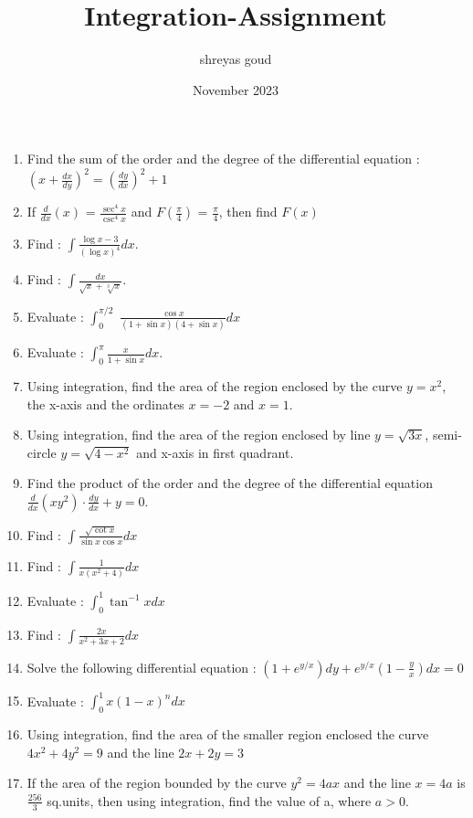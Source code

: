 \documentclass[12pt,-letter paper]{article}
\title{Integration-Assignment}
\author{shreyas goud }
\date{November 2023}
\providecommand{\brak}[1]{\ensuremath{\left(#1\right)}}
\begin{document}
\maketitle
  \begin{enumerate}
      \item Find the sum of the order and the degree of the differential equation :
      $\brak{x+\frac{dx}{dy}}^2 = \brak{\frac{dy}{dx}}^2 + 1$ 
      \item  If $\frac{d}{dx}(x)$ = $\frac{\sec ^4 x}{\csc ^4 x}$ and 
      $F\brak{\frac{\pi}{4}}$ = $\frac{\pi}{4}$, then find $F(x)$
      
      \item Find : $\int \frac{\log x-3}{(\log x)^4}dx.$
      \item Find : $\int \frac{dx}{\sqrt{x}+\sqrt[3]{x}}.$
      \item Evaluate : $\int_{0}^{\pi/2}$ $ \frac{\cos x}{(1 + \sin x)(4 + \sin x)}dx$
      \item Evaluate : $\int_{0}^{\pi} \frac{x}{1 + \sin x}dx.$
      \item Using integration, find the area of the region enclosed by the curve $y = x^2$, the x-axis and the ordinates $x=-2$ and $x=1$.
      \item Using integration, find the area of the region enclosed by line $y = \sqrt{3x}$, semi-circle $y = \sqrt{4-x^2}$ and x-axis in first quadrant.
      \item Find the product of the order and the degree of the differential equation  
      $\frac{d}{dx}\brak{xy^2}\cdot \frac{dy}{dx}+y = 0$. 
      \item Find : $\int \frac{\sqrt{\cot x}}{\sin x \cos x} dx$
      \item Find : $\int \frac{1}{x(x^2 + 4)}dx$
      \item Evaluate : $\int_{0}^{1} \tan^{-1} xdx$
      \item Find : $\int \frac{2x}{x^2 + 3x + 2 } dx$
      \item Solve the following differential equation :
      $\left(1 + e^{y/x}\right)dy + e^{y/x} (1-\frac{y}{x})dx = 0$
      \item Evaluate : $\int_{0}^1 x(1-x)^n dx$
      \item Using integration, find the area of the smaller region enclosed the curve  $4x^2 + 4y^2 = 9$ and the line $2x + 2y = 3$
      \item If the area of the region bounded by the curve $y^2 = 4ax$ and the line $x = 4a$ is $\frac{256}{3}$ sq.units, then using integration, find the value of a, where $a > 0$.

\end{enumerate}
\end{document}
